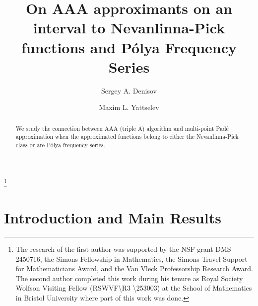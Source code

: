 \documentclass[twoside,a4paper]{amsart}
\theoremstyle{remark}
\begin{document}
\title[On AAA approximants]{On AAA approximants on an interval to Nevanlinna-Pick functions and P\'olya Frequency Series}

\begin{abstract}
We study the connection between AAA (triple A) algorithm and  multi-point Pad\'e approximation when the approximated functions belong to either the Nevanlinna-Pick class or are P\'olya frequency series. 
\end{abstract}



\author{Sergey A. Denisov}
\address{Department of Mathematics, University of Wisconsin-Madison, 480~Lincoln Dr., Madison, WI 53706, USA}


\author{Maxim L. Yattselev}

\address{Department of Mathematical Sciences, Indiana University Indianapolis, 402~North Blackford Street, Indianapolis, IN 46202}




\thanks{The research of the first author was supported by the  NSF grant DMS-2450716, the Simons Fellowship in Mathematics, the Simons Travel Support for Mathematicians Award, and the Van Vleck Professorship Research Award.  The second author completed this work during his tenure as Royal Society Wolfson Visiting Fellow (RSWVF\textbackslash R3 \textbackslash 253003) at the School of Mathematics in Bristol University where part of this work was done.} 

\subjclass{}

\keywords{}

\maketitle

\section{Introduction and Main Results}
\end{document}
